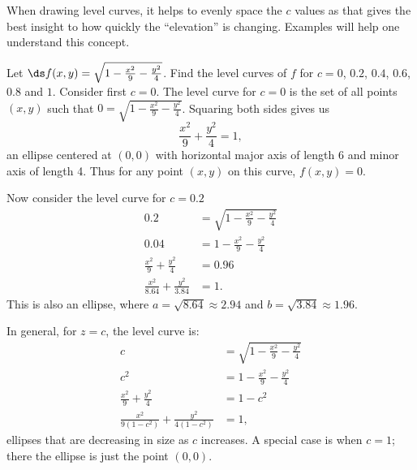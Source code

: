 When drawing level curves, it helps to evenly space the $c$ values as that gives the best insight to how quickly the ``elevation'' is changing. Examples will help one understand this concept.

\begin{example}\label{ex_levelcurve1}
Let $\ds f(x,y) = \sqrt{1-\frac{x^2}9-\frac{y^2}4}$. Find the level curves of $f$ for $c=0$, $0.2$, $0.4$, $0.6$, $0.8$ and $1$.
\solution
Consider first $c=0$. The level curve for $c=0$ is the set of all points $(x,y)$ such that $0=\sqrt{1-\frac{x^2}9-\frac{y^2}4}$. Squaring both sides  gives us
\[\frac{x^2}9+\frac{y^2}4=1,\]
an ellipse centered at $(0,0)$ with horizontal major axis of length 6 and minor axis of length 4. Thus for any point $(x,y)$ on this curve, $f(x,y) = 0$.

Now consider the level curve for $c=0.2$
\begin{align*}
0.2 &= \sqrt{1-\frac{x^2}9-\frac{y^2}4}\\
0.04 &= 1-\frac{x^2}9-\frac{y^2}4\\
\frac{x^2}9+\frac{y^2}4 &=0.96\\
\frac{x^2}{8.64}+\frac{y^2}{3.84} &=1.
\end{align*}
This is also an ellipse, where $a = \sqrt{8.64}\approx 2.94$ and $b=\sqrt{3.84}\approx 1.96$.

In general, for $z=c$, the level curve is:
\begin{align*}
c &= \sqrt{1-\frac{x^2}9-\frac{y^2}4}\\
c^2 &= 1-\frac{x^2}9-\frac{y^2}4\\
\frac{x^2}9+\frac{y^2}4 &=1-c^2\\
\frac{x^2}{9(1-c^2)}+\frac{y^2}{4(1-c^2)} &=1,
\end{align*}
ellipses that are decreasing in size as $c$ increases. A special case is when $c=1$; there the ellipse is just the point $(0,0)$. 


\end{example}
